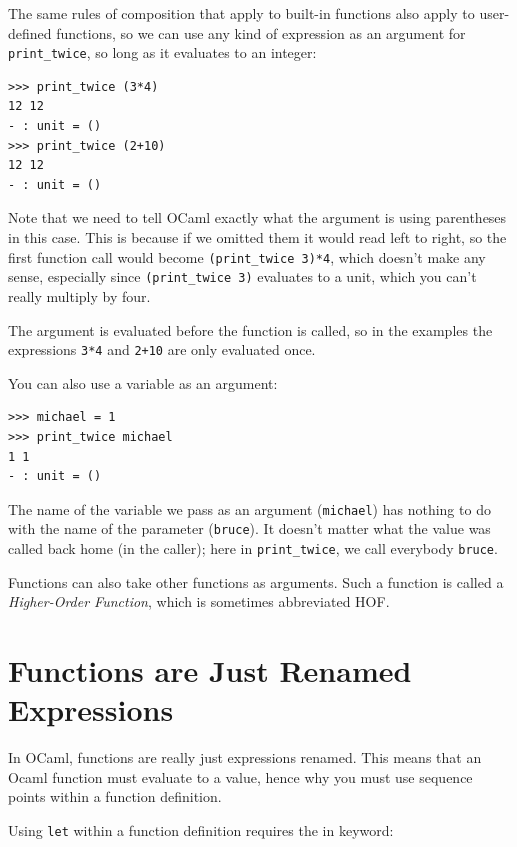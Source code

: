 \documentclass[10pt]{book}
\begin{document}
The same rules of composition that apply to built-in functions also
apply to user-defined functions, so we can use any kind of expression
as an argument for \verb"print_twice", so long as it evaluates to an integer:


\beforeverb
\begin{verbatim}
>>> print_twice (3*4)
12 12
- : unit = ()
>>> print_twice (2+10)
12 12
- : unit = ()
\end{verbatim}
\afterverb
%
Note that we need to tell OCaml exactly what the argument is using parentheses in this case.
This is because if we omitted them it would read left to right, so the first function call 
would become {\tt (\verb"print_twice" 3)*4}, which doesn't make any sense, especially since
{\tt (\verb"print_twice" 3)} evaluates to a unit, which you can't really multiply by four.

The argument is evaluated before the function is called, so
in the examples the expressions {\tt 3*4} and
{\tt 2+10} are only evaluated once.


You can also use a variable as an argument:

\beforeverb
\begin{verbatim}
>>> michael = 1
>>> print_twice michael
1 1
- : unit = ()
\end{verbatim}
\afterverb
%
The name of the variable we pass as an argument ({\tt michael}) has
nothing to do with the name of the parameter ({\tt bruce}).  It
doesn't matter what the value was called back home (in the caller);
here in \verb"print_twice", we call everybody {\tt bruce}.


Functions can also take other functions as arguments. Such a function
is called a {\em Higher-Order Function}, which is sometimes abbreviated HOF.


\section{Functions are Just Renamed Expressions}

In OCaml, functions are really just expressions renamed. This means that an 
Ocaml function must evaluate to a value, hence why you must use sequence points 
within a function definition.

Using {\tt let} within a function definition requires the in keyword:
\end{document}
